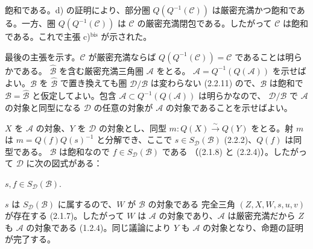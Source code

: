 \clearpage
{}%
\begingroup
\small
\setlength{\parskip}{0pt}%
\setlength{\emergencystretch}{1.5em}%
\setlength{\abovedisplayskip}{3pt plus 1pt minus 1pt}%
\setlength{\belowdisplayskip}{3pt plus 1pt minus 1pt}%

\noindent 飽和である。d) の証明により、部分圏
$Q(Q^{-1}(\mathcal C))$ は厳密充満かつ飽和である。一方、圏
$Q(Q^{-1}(\mathcal C))$ は $\mathcal C$ の厳密充満閉包である。したがって
$\mathcal C$ は飽和である。これで主張 c)$^{\mathrm{bis}}$ が示された。

最後の主張を示す。$\mathcal C$ が厳密充満ならば
$Q(Q^{-1}(\mathcal C))=\mathcal C$ であることは明らかである。
$\widehat{\mathcal B}$ を含む厳密充満三角圏 $\mathcal A$ をとる。
$\mathcal A=Q^{-1}(Q(\mathcal A))$ を示せばよい。$\mathcal B$ を
$\widehat{\mathcal B}$ で置き換えても圏 $\mathcal D/\mathcal B$ は変わらない
(2.2.11) ので、$\mathcal B$ は飽和で
$\mathcal B=\widehat{\mathcal B}$ と仮定してよい。包含
$\mathcal A\subset Q^{-1}(Q(\mathcal A))$ は明らかなので、
$\mathcal D/\mathcal B$ で $\mathcal A$ の対象と同型になる
$\mathcal D$ の任意の対象が $\mathcal A$ の対象であることを示せばよい。

$X$ を $\mathcal A$ の対象、$Y$ を $\mathcal D$ の対象とし、同型
$m\colon Q(X)\xrightarrow{\sim}Q(Y)$ をとる。射 $m$ は
$m=Q(f)Q(s)^{-1}$ と分解でき、ここで
$s\in S_{\mathcal D}(\mathcal B)$ (2.2.2)、$Q(f)$ は同型である。
$\mathcal B$ は飽和なので $f\in S_{\mathcal D}(\mathcal B)$ である
（(2.1.8) と (2.2.4)）。したがって $\mathcal D$ に次の図式がある：

\begin{center}
  \qquad $s,f\in S_{\mathcal D}(\mathcal B)$\quad .
\end{center}

$s$ は $S_{\mathcal D}(\mathcal B)$ に属するので、$W$ が $\mathcal B$ の対象である
完全三角 $(Z,X,W,s,u,v)$ が存在する (2.1.7)。したがって $W$ は
$\mathcal A$ の対象であり、$\mathcal A$ は厳密充満だから $Z$ も
$\mathcal A$ の対象である (1.2.4)。同じ議論により $Y$ も
$\mathcal A$ の対象となり、命題の証明が完了する。

